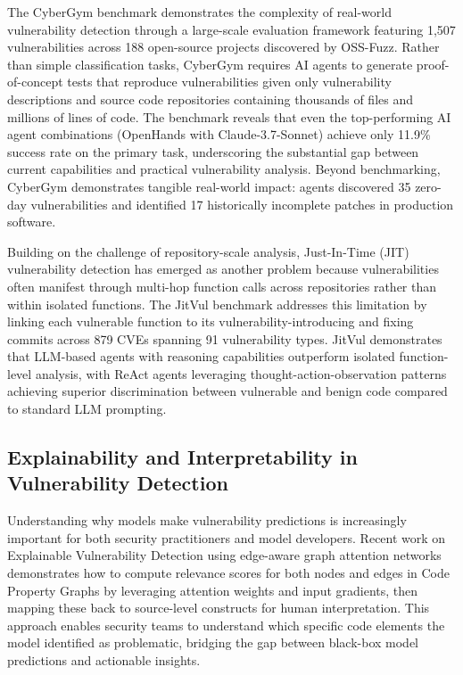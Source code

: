 \documentclass[12pt,a4paper]{article}
\begin{document}
The CyberGym benchmark \cite{cybergym} demonstrates the complexity of real-world vulnerability detection through a large-scale evaluation framework featuring 1,507 vulnerabilities across 188 open-source projects discovered by OSS-Fuzz. Rather than simple classification tasks, CyberGym requires AI agents to generate proof-of-concept tests that reproduce vulnerabilities given only vulnerability descriptions and source code repositories containing thousands of files and millions of lines of code. The benchmark reveals that even the top-performing AI agent combinations (OpenHands with Claude-3.7-Sonnet) achieve only 11.9\% success rate on the primary task, underscoring the substantial gap between current capabilities and practical vulnerability analysis. Beyond benchmarking, CyberGym demonstrates tangible real-world impact: agents discovered 35 zero-day vulnerabilities and identified 17 historically incomplete patches in production software.


Building on the challenge of repository-scale analysis, Just-In-Time (JIT) vulnerability detection has emerged as another problem because vulnerabilities often manifest through multi-hop function calls across repositories rather than within isolated functions. The JitVul benchmark \cite{jitvul} addresses this limitation by linking each vulnerable function to its vulnerability-introducing and fixing commits across 879 CVEs spanning 91 vulnerability types. JitVul demonstrates that LLM-based agents with reasoning capabilities outperform isolated function-level analysis, with ReAct agents leveraging thought-action-observation patterns achieving superior discrimination between vulnerable and benign code compared to standard LLM prompting.

\subsection{Explainability and Interpretability in Vulnerability Detection}

Understanding why models make vulnerability predictions is increasingly important for both security practitioners and model developers. Recent work on Explainable Vulnerability Detection \cite{explainable_vuln} using edge-aware graph attention networks demonstrates how to compute relevance scores for both nodes and edges in Code Property Graphs by leveraging attention weights and input gradients, then mapping these back to source-level constructs for human interpretation. This approach enables security teams to understand which specific code elements the model identified as problematic, bridging the gap between black-box model predictions and actionable insights.
\end{document}
